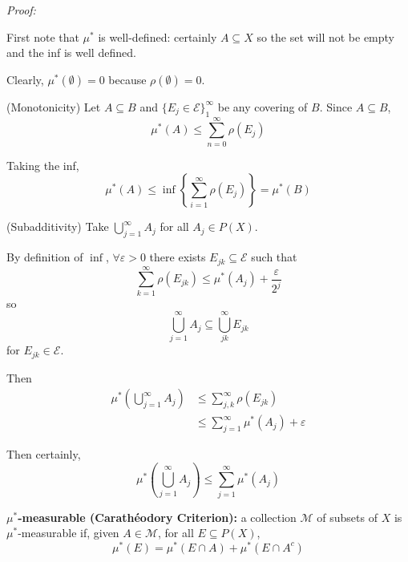 \documentclass[12pt]{report}
\newcommand{\ep}{\varepsilon}
\newcommand{\Ec}{\mathcal{E}}
\newcommand{\M}{\mathcal{M}}
\newcommand{\sub}{\subseteq}
\newenvironment*{tbox}[2][gray]{
    \begin{tcolorbox}[
        parbox=false,
        colback=#1!5!white,
        colframe=#1!75!black,
        breakable,
        title={#2}
    ]}
    {\end{tcolorbox}}
\begin{document}
        \begin{tbox}{\textbf{Proposition:} Let $\Ec \sub P(X)$ such that $X, \emptyset \in \Ec$. Define $\rho: \Ec \to [0, \infty]$ with $\rho(\emptyset) = 0$. $\forall A \sub P(X)$, let
            \[\mu^*(A) = \inf\left\{\sum_{i=0}^\infty \rho(E_j) \bigg\vert E_j \in \Ec, \; A \sub \bigcup_{j=1}^\infty E_j\right\}\]
            (i.e. take the inf of the sum of all coverings of $A$). Then $\mu^*$ is an outer measure.}
            
            \emph{Proof:}
            
            First note that $\mu^*$ is well-defined: certainly $A \sub X$ so the set will not be empty and the inf is well defined. 

            Clearly, $\mu^*(\emptyset) = 0$ because $\rho(\emptyset) = 0$.

            (Monotonicity) Let $A \sub B$ and $\{E_j \in \Ec\}_1^{\infty}$ be any covering of $B$. Since $A \sub B$, 
            \[\mu^*(A) \leq \sum_{n=0}^\infty \rho(E_j)\]

            Taking the inf, 
            \[\mu^*(A) \leq \inf\left\{\sum_{i=1}^{\infty} \rho(E_j)\right\} = \mu^*(B)\]

            (Subadditivity) Take $\bigcup_{j=1}^{\infty} A_j$ for all $A_j \in P(X)$. 

            By definition of $\inf$, $\forall \ep > 0$ there exists $E_{jk} \sub \Ec$ such that  
            \[\sum_{k=1}^{\infty} \rho(E_{jk}) \leq \mu^*(A_j) + \frac{\ep}{2^j}\]
            so 
            \[\bigcup_{j=1}^{\infty} A_j \sub \bigcup_{jk}^{\infty} E_{jk}\]
            for $E_{jk} \in \Ec$. 

            Then 
            \begin{align*}
                \mu^*\left(\bigcup_{j=1}^\infty A_j\right) &\leq \sum_{j, k}^\infty  \rho(E_{jk})\\ 
                    &\leq \sum_{j=1}^{\infty} \mu^*(A_j) + \ep
            \end{align*}

            Then certainly, 
            \[\mu^*\left(\bigcup_{j=1}^\infty A_j\right) \leq \sum_{j=1}^\infty \mu^*(A_j)\]
        \end{tbox}

        \textbf{$\mu^*$-measurable (Carathéodory Criterion):} a collection $\M$ of subsets of $X$ is $\mu^*$-measurable if, given $A \in \M$, for all $E \sub P(X)$,
        \[\mu^*(E) = \mu^*(E \cap A) + \mu^*(E \cap A^c)\]
\end{document}
